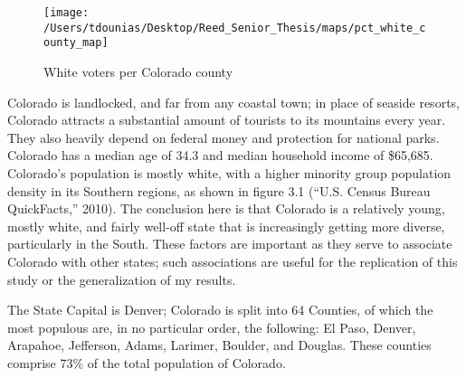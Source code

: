 \documentclass[12pt,twoside]{reedthesis}
\begin{document}
  \begin{figure}
  
  {\centering \texttt{[image: /Users/tdounias/Desktop/Reed\_Senior\_Thesis/maps/pct\_white\_county\_map]} 
  
  }
  
  \caption[White voters per Colorado county]{White voters per Colorado county}\label{fig:white pct map}
  \end{figure}
  
  Colorado is landlocked, and far from any coastal town; in place of
  seaside resorts, Colorado attracts a substantial amount of tourists to
  its mountains every year. They also heavily depend on federal money and
  protection for national parks. Colorado has a median age of 34.3 and
  median household income of \$65,685. Colorado's population is mostly
  white, with a higher minority group population density in its Southern
  regions, as shown in figure 3.1 (``U.S. Census Bureau QuickFacts,''
  2010). The conclusion here is that Colorado is a relatively young,
  mostly white, and fairly well-off state that is increasingly getting
  more diverse, particularly in the South. These factors are important as
  they serve to associate Colorado with other states; such associations
  are useful for the replication of this study or the generalization of my
  results.
  
  The State Capital is Denver; Colorado is split into 64 Counties, of
  which the most populous are, in no particular order, the following: El
  Paso, Denver, Arapahoe, Jefferson, Adams, Larimer, Boulder, and Douglas.
  These counties comprise 73\% of the total population of Colorado.
  
\end{document}

